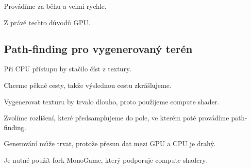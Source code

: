 Provádíme za běhu a velmi rychle.

Z právě techto důvodů GPU.

\subsection{Path-finding pro vygenerovaný terén}
Při CPU přístupu by stačilo číst z textury.

Chceme pěkné cesty, takže výslednou cestu zkrášlujeme.

Vygenerovat texturu by trvalo dlouho, proto použijeme compute shader.

Zvolíme rozlišení, které předsamplujeme do pole, ve kterém poté provádíme path-finding.

Generování může trvat, protože přesun dat mezi GPU a CPU je drahý.

Je nutné použít fork MonoGame, který podporuje compute shadery.



























